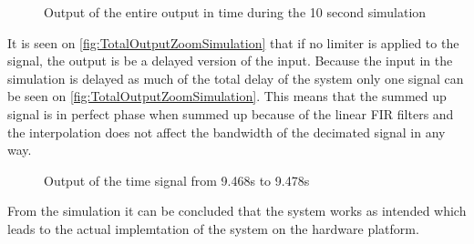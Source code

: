 \begin{figure}[H]
    \centering
    
    \caption{Output of the entire output in time during the 10 second simulation}
    \label{fig:TotalOutputSimulation}
\end{figure}

It is seen on \autoref{fig:TotalOutputZoomSimulation} that if no limiter is applied to the signal, the output is be a delayed version of the input. Because the input in the simulation is delayed as much of the total delay of the system only one signal can be seen on \autoref{fig:TotalOutputZoomSimulation}. This means that the summed up signal is in perfect phase when summed up because of the linear FIR filters and the interpolation does not affect the bandwidth of the decimated signal in any way.      

\begin{figure}[H]
    \centering
    
    \caption{Output of the time signal from 9.468s to 9.478s}
    \label{fig:TotalOutputZoomSimulation}
\end{figure}

From the simulation it can be concluded that the system works as intended which leads to the actual implemtation of the system on the hardware platform. 



 




